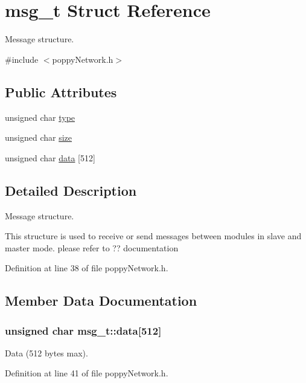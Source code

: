 \hypertarget{structmsg__t}{\section{msg\-\_\-t Struct Reference}
\label{structmsg__t}
}


Message structure.  




{\ttfamily \#include $<$poppy\-Network.\-h$>$}

\subsection*{Public Attributes}
\begin{DoxyCompactItemize}
\item 
unsigned char \hyperlink{structmsg__t_ab5695ddf57fd2834cdfe4b6f6e89fc3e}{type}
\item 
unsigned char \hyperlink{structmsg__t_a3736f2ca203e665223b225ca07def9b5}{size}
\item 
unsigned char \hyperlink{structmsg__t_ab11ea949abe5142d3e5c5911cf971860}{data} \mbox{[}512\mbox{]}
\end{DoxyCompactItemize}


\subsection{Detailed Description}
Message structure. 

This structure is used to receive or send messages between modules in slave and master mode. please refer to ?? documentation 

Definition at line 38 of file poppy\-Network.\-h.



\subsection{Member Data Documentation}
\hypertarget{structmsg__t_ab11ea949abe5142d3e5c5911cf971860}{
\subsubsection[{data}]{\setlength{\rightskip}{0pt plus 5cm}unsigned char msg\-\_\-t\-::data\mbox{[}512\mbox{]}}}\label{structmsg__t_ab11ea949abe5142d3e5c5911cf971860}
Data (512 bytes max). 

Definition at line 41 of file poppy\-Network.\-h.

